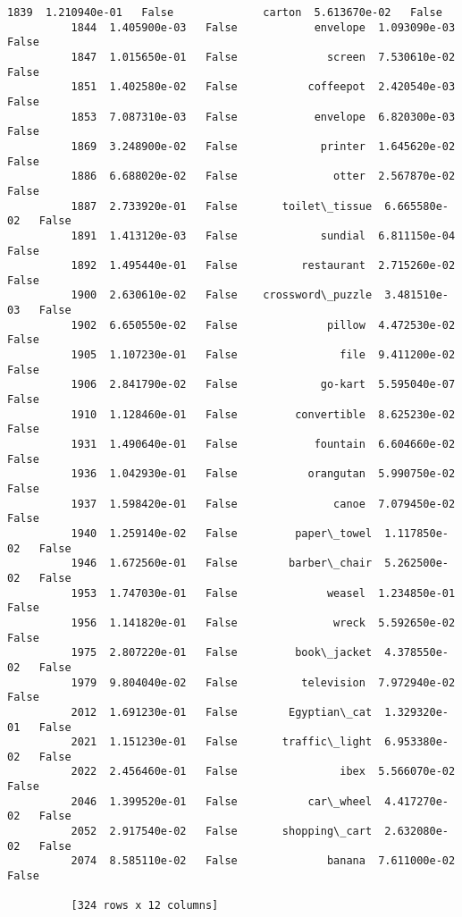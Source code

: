 \documentclass[11pt]{article}
\begin{document}
\begin{Verbatim}[commandchars=\\\{\}]
          1839  1.210940e-01   False              carton  5.613670e-02   False  
          1844  1.405900e-03   False            envelope  1.093090e-03   False  
          1847  1.015650e-01   False              screen  7.530610e-02   False  
          1851  1.402580e-02   False           coffeepot  2.420540e-03   False  
          1853  7.087310e-03   False            envelope  6.820300e-03   False  
          1869  3.248900e-02   False             printer  1.645620e-02   False  
          1886  6.688020e-02   False               otter  2.567870e-02   False  
          1887  2.733920e-01   False       toilet\_tissue  6.665580e-02   False  
          1891  1.413120e-03   False             sundial  6.811150e-04   False  
          1892  1.495440e-01   False          restaurant  2.715260e-02   False  
          1900  2.630610e-02   False    crossword\_puzzle  3.481510e-03   False  
          1902  6.650550e-02   False              pillow  4.472530e-02   False  
          1905  1.107230e-01   False                file  9.411200e-02   False  
          1906  2.841790e-02   False             go-kart  5.595040e-07   False  
          1910  1.128460e-01   False         convertible  8.625230e-02   False  
          1931  1.490640e-01   False            fountain  6.604660e-02   False  
          1936  1.042930e-01   False           orangutan  5.990750e-02   False  
          1937  1.598420e-01   False               canoe  7.079450e-02   False  
          1940  1.259140e-02   False         paper\_towel  1.117850e-02   False  
          1946  1.672560e-01   False        barber\_chair  5.262500e-02   False  
          1953  1.747030e-01   False              weasel  1.234850e-01   False  
          1956  1.141820e-01   False               wreck  5.592650e-02   False  
          1975  2.807220e-01   False         book\_jacket  4.378550e-02   False  
          1979  9.804040e-02   False          television  7.972940e-02   False  
          2012  1.691230e-01   False        Egyptian\_cat  1.329320e-01   False  
          2021  1.151230e-01   False       traffic\_light  6.953380e-02   False  
          2022  2.456460e-01   False                ibex  5.566070e-02   False  
          2046  1.399520e-01   False           car\_wheel  4.417270e-02   False  
          2052  2.917540e-02   False       shopping\_cart  2.632080e-02   False  
          2074  8.585110e-02   False              banana  7.611000e-02   False  
          
          [324 rows x 12 columns]
\end{Verbatim}
            
\end{document}
